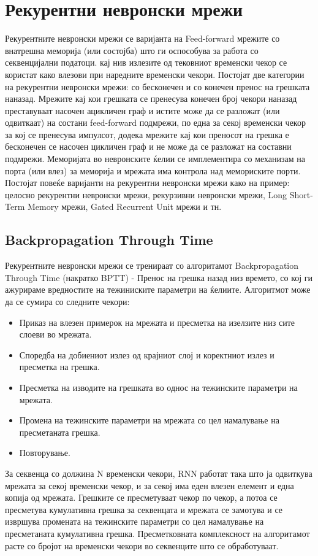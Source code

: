 \section{Рекурентни невронски мрежи}

Рекурентните невронски мрежи се варијанта на Feed-forward мрежите со внатрешна меморија (или состојба) што ги оспособува за работа со секвенцијални податоци. кај нив излезите од тековниот временски чекор се користат како влезови при наредните временски чекори. Постојат две категории на рекурентни невронски мрежи: со бесконечен и со конечен пренос на грешката наназад. Мрежите кај кои грешката се пренесува конечен број чекори наназад преставуваат насочен ацикличен граф и истите може да се разложат (или одвиткаат) на состани feed-forward подмрежи, по една за секој временски чекор за кој се пренесува импулсот, додека мрежите кај кои преносот на грешка е бесконечен се насочен цикличен граф и не може да се разложат на составни подмрежи. Меморијата во невронските ќелии се имплементира со механизам на порта (или влез) за меморија и мрежата има контрола над мемориските порти. Постојат повеќе варијанти на рекурентни невронски мрежи како на пример: целосно рекурентни невронски мрежи, рекурзивни невронски мрежи, Long Short-Term Memory мрежи, Gated Recurrent Unit мрежи и тн. 

\subsection{Backpropagation Through Time}
Рекурентните невронски мрежи се тренираат со алгоритамот Backpropagation Through Time (накратко BPTT) - Пренос на грешка назад низ времето, со кој ги ажурираме вредностите на тежиниските параметри на ќелиите. Алгоритмот може да се сумира со следните чекори:
\begin{itemize}
    \item Приказ на влезен примерок на мрежата и пресметка на изелзите низ сите слоеви во мрежата.
    \item Споредба на добиениот излез од крајниот слој и коректниот излез и пресметка на грешка.
    \item Пресметка на изводите на грешката во однос на тежинските параметри на мрежата.
    \item Промена на тежинските параметри на мрежата со цел намалување на пресметаната грешка.
    \item Повторување.
\end{itemize}

За секвенца со должина N временски чекори, RNN работат така што ја одвиткува мрежата за секој временски чекор, и за секој има еден влезен елемент и една копија од мрежата. Грешките се пресметуваат чекор по чекор, а потоа се пресметува кумулативна грешка за секвенцата и мрежата се замотува и се извршува промената на тежинските параметри со цел намалување на пресметаната кумулативна грешка. Пресметковната комплексност на алгоритамот расте со бројот на временски чекори во секвенците што се обработуваат. 

